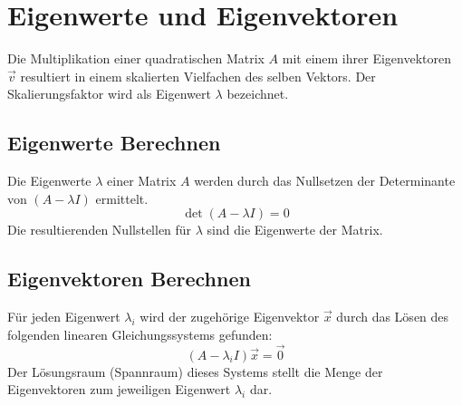 \chapter{Eigenwerte und Eigenvektoren}
Die Multiplikation einer quadratischen Matrix $A$ mit einem ihrer Eigenvektoren $\vec{v}$ resultiert in einem skalierten Vielfachen des selben Vektors. Der Skalierungsfaktor wird als Eigenwert $\lambda$ bezeichnet.

\section{Eigenwerte Berechnen}
Die Eigenwerte $\lambda$ einer Matrix $A$ werden durch das Nullsetzen der Determinante von $(A - \lambda I)$ ermittelt.
\[
    \det(A - \lambda I) = 0
\]
Die resultierenden Nullstellen für $\lambda$ sind die Eigenwerte der Matrix.

\section{Eigenvektoren Berechnen}
Für jeden Eigenwert $\lambda_i$ wird der zugehörige Eigenvektor $\vec{x}$ durch das Lösen des folgenden linearen Gleichungssystems gefunden:
\[
    (A - \lambda_i I) \vec{x} = \vec{0}
\]
Der Lösungsraum (Spannraum) dieses Systems stellt die Menge der Eigenvektoren zum jeweiligen Eigenwert $\lambda_i$ dar.